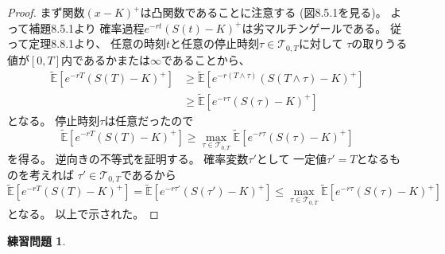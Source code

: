 \documentclass[uplatex]{jsarticle}
\theoremstyle{definition}
\newtheorem{prob}[prob]{練習問題}
\def\E{\mathbb{E}}
\def\mcT{\mathcal{T}}
\begin{document}
\begin{proof}
  まず関数\((x-K)^+\)は凸関数であることに注意する
  (図8.5.1を見る)。
  よって補題8.5.1より
  確率過程\(e^{-rt}\left( S(t)-K \right)^+\)は劣マルチンゲールである。
  従って定理8.8.1より、
  任意の時刻\(t\)と任意の停止時刻\(\tau\in\mcT_{0,T}\)に対して
  \(\tau\)の取りうる値が\([0,T]\)内であるかまたは\(\infty\)であることから、
  \begin{align*}
    \tilde{\E}\left[ e^{-rT}\left( S(T)-K \right)^+ \right]
    &\geq \tilde{\E}\left[ e^{-r(T\wedge \tau)}
    \left( S(T\wedge\tau)-K \right)^+ \right] \\
    &\geq \tilde{\E}\left[ e^{-r\tau}
    \left( S(\tau)-K \right)^+ \right]
  \end{align*}
  となる。
  停止時刻\(\tau\)は任意だったので
  \[
  \tilde{\E}\left[ e^{-rT}\left( S(T)-K \right)^+ \right]
  \geq \max_{\tau\in\mcT_{0,T}}\tilde{\E}\left[ e^{-r\tau}
  \left( S(\tau)-K \right)^+ \right]
  \]
  を得る。
  逆向きの不等式を証明する。
  確率変数\(\tau'\)として
  一定値\(\tau' = T\)となるものを考えれば
  \(\tau'\in\mcT_{0,T}\)であるから
  \[
  \tilde{\E}\left[ e^{-rT}\left( S(T)-K \right)^+ \right]
  = \tilde{\E}\left[ e^{-r\tau'}\left( S(\tau')-K \right)^+ \right]
  \leq \max_{\tau\in\mcT_{0,T}}\tilde{\E}\left[ e^{-r\tau}
  \left( S(\tau)-K \right)^+ \right]
  \]
  となる。
  以上で示された。
\end{proof}













\begin{prob}\label{prob: 8.7}
\end{prob}
\end{document}
